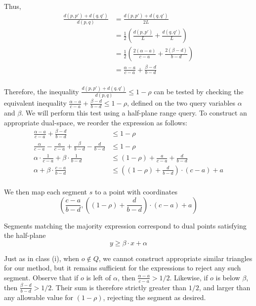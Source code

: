 \noindent Thus,
\[
\begin{split} 
\frac{d(p, p') + d(q, q')}{d(p, q)}
%
&= \frac{d(p, p') + d(q, q')}{2L} \\
%
&= \frac{1}{2} \left ( \frac{d(p, p')}{L} + \frac{d(q, q')}{L} \right ) \\
%
&= \frac{1}{2} \left ( \frac{2(\alpha - a)}{c - a} + \frac{2(\beta - d)}{b - d} \right ) \\
%
&= \frac{\alpha - a}{c - a} + \frac{\beta - d}{b - d} \\
%
\end{split}
\]

Therefore, the inequality $\frac{d(p, p') + d(q, q')}{d(p, q)} \leq 1 - \rho$ can be tested by checking the equivalent inequality $\frac{\alpha - a}{c - a} + \frac{\beta - d}{b - d} \leq 1 - \rho$, defined on the two query variables $\alpha$ and $\beta$. We will perform this test using a half-plane range query. To construct an appropriate dual-space, we reorder the expression as follows:
\[
\begin{split}
\frac{\alpha - a}{c - a} + \frac{\beta - d}{b - d} &\leq 1 - \rho \\
%
\frac{\alpha}{c-a} - \frac{a}{c-a} + \frac{\beta}{b-d} - \frac{d}{b-d} &\leq 1 - \rho \\
%
\alpha \cdot \frac{1}{c-a} + \beta \cdot \frac{1}{b-d} &\leq (1 - \rho) + \frac{a}{c-a} + \frac{d}{b-d} \\
%
\alpha + \beta \cdot \frac{c-a}{b-d} &\leq \left ( (1 - \rho) + \frac{d}{b-d} \right ) \cdot (c-a) + a \\
%
\end{split}
\]

We then map each segment $s$ to a point with coordinates
\[
\left (\frac{c-a}{b-d}, \left ( (1 - \rho) + \frac{d}{b-d} \right ) \cdot (c-a) + a \right )
\]

\noident Segments matching the majority expression correspond to dual points satisfying the half-plane 
\[
y \geq \beta \cdot x + \alpha
\]

Just as in class (i), when $o \not \in Q$, we cannot construct appropriate similar triangles for our method, but it remains sufficient for the expressions to reject any such segment. Observe that if $o$ is left of $\alpha$, then $\frac{\alpha - a}{c - a} > 1/2$. Likewise, if $o$ is below $\beta$, then $\frac{\beta - d}{b - d} > 1/2$. Their sum is therefore strictly greater than $1/2$, and larger than any allowable value for $(1 - \rho)$, rejecting the segment as desired.



